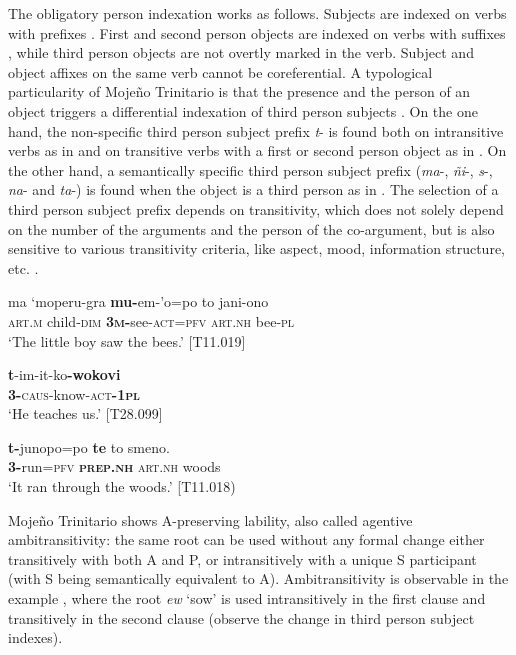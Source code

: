 \documentclass[output=paper]{langscibook}
\begin{document}
The obligatory person indexation works as follows. Subjects are indexed on verbs with prefixes . First and second person objects are indexed on verbs with suffixes , while third person objects are not overtly marked in the verb. Subject and object affixes on the same verb cannot be coreferential. A typological particularity of Mojeño Trinitario is that the presence and the person of an object triggers a differential indexation of third person subjects \citep{Rose2011}. On the one hand, the non-specific third person subject prefix \textit{t}- is found both on intransitive verbs as in  and on transitive verbs with a first or second person object as in . On the other hand, a semantically specific third person subject prefix (\textit{ma}-, \textit{ñi}-, \textit{s}-, \textit{na}- and \textit{ta}-) is found when the object is a third person as in . The selection of a third person subject prefix depends on transitivity, which does not solely depend on the number of the arguments and the person of the co-argument, but is also sensitive to various transitivity criteria, like aspect, mood, information structure, etc. \citep{Rose2011}.


\ea
\label{ex:Rose:3}
\gll ma `moperu-gra \textbf{mu-}em-'o=po to jani-ono\\
\textsc{art.m} child-\textsc{dim} \textsc{\textbf{3m}}\textbf{-}see-\textsc{act=pfv} \textsc{art.nh} bee-\textsc{pl}\\
\glt ‘The little boy saw the bees.’ [T11.019]
\z

\ea
\label{ex:Rose:4}
\gll \textbf{t}-im-it-ko\textbf{-wokovi}\\
\textbf{3-}\textsc{caus}-know-\textsc{act}\textbf{-1}\textbf{\textsc{pl}}\\
\glt ‘He teaches us.’ [T28.099]
\z

\ea
\label{ex:Rose:5}
\gll \textbf{t-}junopo=po \textbf{te} to smeno.\\
\textbf{3-}run=\textsc{pfv} \textbf{\textsc{prep.nh}} \textsc{art.nh} woods\\
\glt ‘It ran through the woods.’ [T11.018)
\z


Mojeño Trinitario shows A-preserving lability, also called agentive ambitransitivity: the same root can be used without any formal change either transitively with both A and P, or intransitively with a unique S participant (with S being semantically equivalent to A). Ambitransitivity is observable in the example , where the root \textit{ew} ‘sow’ is used intransitively in the first clause and transitively in the second clause (observe the change in third person subject indexes).
\end{document}
